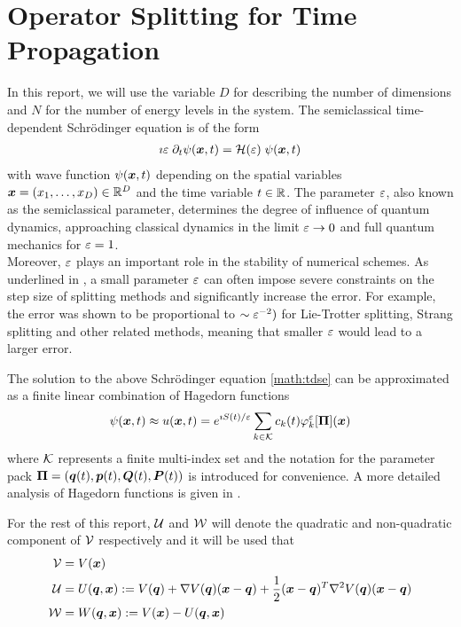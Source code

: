 \section{Operator Splitting for Time Propagation}
\label{sec:operatorsplitting}
%
In this report, we will use the variable $D$ for describing the number of dimensions and $N$ for the number of energy levels in the system.
The semiclassical time-dependent Schrödinger equation is of the form
%
\begin{align}
	\label{math:tdse}
	\imath \varepsilon \; \partial_t \psi (\bm{x},t) = \mathcal{H} (\varepsilon) \; \psi (\bm{x},t)
\end{align}
%
with wave function $\psi(\bm{x},t)$ depending on the spatial variables $\bm{x} = (x_1,\dots,x_D) \in \mathbb{R}^D$ and the time variable $t \in \mathbb{R}$.
The parameter $\varepsilon$, also known as the semiclassical parameter, determines the degree of influence of quantum dynamics, approaching classical dynamics in the limit $\varepsilon \rightarrow 0$ and full quantum mechanics for $\varepsilon = 1$. \\
Moreover, $\varepsilon$ plays an important role in the stability of numerical schemes.
As underlined in \cite{GH_convsemiclassical}, a small parameter $\varepsilon$ can often impose severe constraints on the step size of splitting methods and significantly increase the error. For example, the error was shown to be proportional to $\sim \varepsilon^{-2})$ for Lie-Trotter splitting, Strang splitting and other related methods, meaning that smaller $\varepsilon$ would lead to a larger error.
\par\medskip
%
The solution to the above Schrödinger equation \ref{math:tdse} can be approximated as a finite linear combination of Hagedorn functions 
\begin{align}
	\label{math:hagedornwp}
	\psi(\bm{x},t) \approx u(\bm{x},t)
	= e^{\imath S(t)/\varepsilon} \sum_{k \in \mathcal{K}} c_k(t) \varphi_k^{\varepsilon} [ \bm{\Pi} ] (\bm{x})
\end{align}
where $\mathcal{K}$ represents a finite multi-index set and the notation for the parameter pack $\bm{\Pi} = (\bm{q}(t),\bm{p}(t),\bm{Q}(t),\bm{P}(t))$ is introduced for convenience.
A more detailed analysis of Hagedorn functions is given in \cite{FGL_semiclassical_dynamics}.
\par\medskip
%
For the rest of this report, $\mathcal{U}$ and $\mathcal{W}$ will denote the quadratic and non-quadratic component of $\mathcal{V}$ respectively and it will be used that
%
\begin{align}
	\mathcal{V} &= V(\bm{x}) \\ 
	\mathcal{U} &= U(\bm{q},\bm{x}) := V(\bm{q}) + \nabla V(\bm{q}) (\bm{x}-\bm{q})
	+ \frac{1}{2} (\bm{x}-\bm{q})^T \nabla^2 V(\bm{q}) (\bm{x}-\bm{q}) \\
	\mathcal{W} &= W(\bm{q},\bm{x}) := V(\bm{x}) - U(\bm{q},\bm{x})
\end{align}
